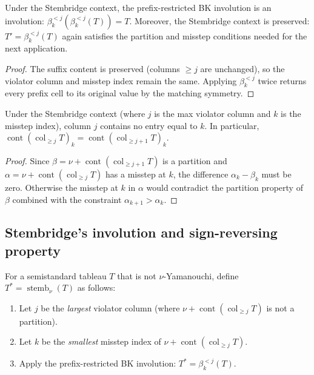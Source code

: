 \begin{lemma}
\label{lem.sf.bk-prefix-involutive-stembridge}
\leanhelper
\leanok
Under the Stembridge context, the prefix-restricted BK involution
is an involution: $\beta_k^{<j}(\beta_k^{<j}(T)) = T$. Moreover,
the Stembridge context is preserved: $T' = \beta_k^{<j}(T)$ again
satisfies the partition and misstep conditions needed for the next application.
\end{lemma}

\begin{proof}
\leanok
The suffix content is preserved (columns $\geq j$ are unchanged), so the
violator column and misstep index remain the same. Applying $\beta_k^{<j}$
twice returns every prefix cell to its original value by the matching symmetry.
\end{proof}

\begin{lemma}
\label{lem.sf.column-j-no-k}
\leanhelper
\leanok
Under the Stembridge context (where $j$ is the max violator column and $k$
is the misstep index), column $j$ contains no entry equal to $k$. In particular,
$\operatorname{cont}(\operatorname{col}_{\geq j} T)_k
= \operatorname{cont}(\operatorname{col}_{\geq j+1} T)_k$.
\end{lemma}

\begin{proof}
\leanok
Since $\beta = \nu + \operatorname{cont}(\operatorname{col}_{\geq j+1} T)$ is a partition
and $\alpha = \nu + \operatorname{cont}(\operatorname{col}_{\geq j} T)$ has a misstep at $k$,
the difference $\alpha_k - \beta_k$ must be zero. Otherwise the misstep at $k$
in $\alpha$ would contradict the partition property of $\beta$ combined with the
constraint $\alpha_{k+1} > \alpha_k$.
\end{proof}

\subsection{Stembridge's involution and sign-reversing property}

\begin{definition}
\label{def.sf.stemb-involution}
\leanhelper
\leanok
For a semistandard tableau $T$ that is not $\nu$-Yamanouchi, define
$T^* = \operatorname{stemb}_\nu(T)$ as follows:
\begin{enumerate}
  \item Let $j$ be the \emph{largest} violator column (where $\nu + \operatorname{cont}(\operatorname{col}_{\geq j} T)$
        is not a partition).
  \item Let $k$ be the \emph{smallest} misstep index of $\nu + \operatorname{cont}(\operatorname{col}_{\geq j} T)$.
  \item Apply the prefix-restricted BK involution: $T^* = \beta_k^{<j}(T)$.
\end{enumerate}
\end{definition}

